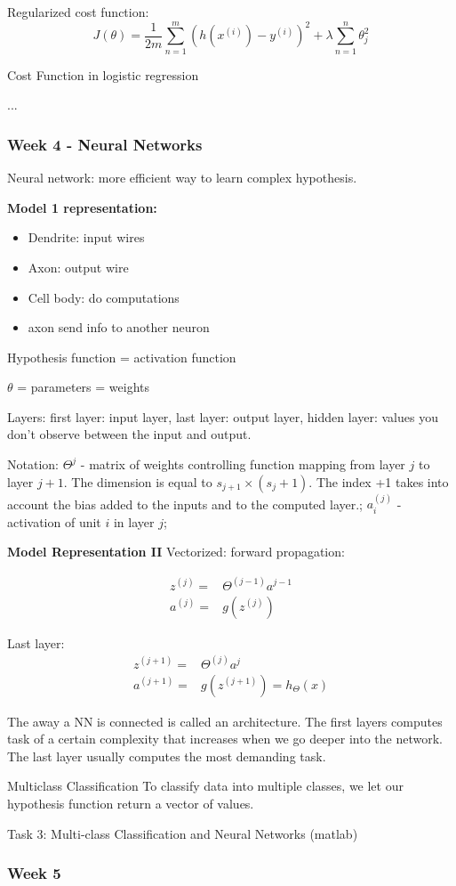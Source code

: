 \documentclass[12pt,a4paper]{report}
\begin{document}
Regularized cost function:
\begin{equation}
J(\theta) = \frac{1}{2m} \sum_{n=1}^{m} (h(x^{(i)})-y^{(i)})^{2} + \lambda\sum_{n=1}^{n} \theta_{j}^{2}
\end{equation}

Cost Function in logistic regression

...	
	
\subsubsection{Week 4 - Neural Networks}
	
	Neural network: more efficient way to learn complex hypothesis.
	
	\textbf{Model 1 representation: }
	\begin{itemize}
	\item Dendrite: input wires
	\item Axon: output wire
	\item Cell body: do computations
	\item axon send info to another neuron
	\end{itemize}
	
	Hypothesis function = activation function
	
	$\theta$ = parameters = weights
	
	Layers: first layer: input layer, last layer: output layer, hidden layer: values you don't observe between the input and output.
	
	Notation: $\Theta^{j}$ - matrix of weights controlling function mapping from layer $j$ to layer $j+1$. The dimension is equal to $s_{j+1} \times (s_{j}+1)$. The index +1 takes into account the bias added to the inputs and to the computed layer.; $a_{i}^{(j)}$ - activation of unit $i$ in layer $j$; 
	
	\textbf{Model Representation II}
	Vectorized: forward propagation:
	
	\begin{align}\label{eq:my_eq}
	z^{(j)} = & \Theta^{(j-1)}a^{j-1} \\
	a^{(j)} = & g(z^{(j)})
	\end{align}
	
Last layer: 	
\begin{align}\label{eq:my_eq}
	z^{(j+1)} = & \Theta^{(j)}a^{j} \\
	a^{(j+1)} = & g(z^{(j+1)}) = h_{\Theta}(x)
	\end{align}
	
	The away a NN is connected is called an architecture.	
	The first layers computes task of a certain complexity that increases when we go deeper into the network. The last layer usually computes the most demanding task.
	
	Multiclass Classification
	To classify data into multiple classes, we let our hypothesis function return a vector of values. 
	
	Task 3: Multi-class Classification and Neural Networks (matlab)
	
	\subsubsection{Week 5}
\end{document}
